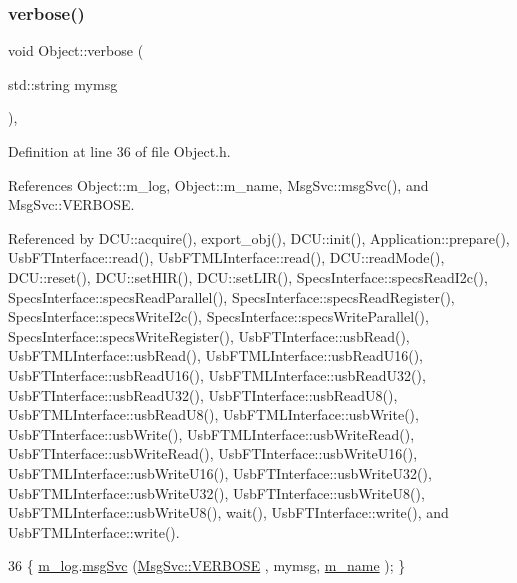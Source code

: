 \subsubsection{\texorpdfstring{verbose()}{verbose()}\hspace{0.1cm}{\footnotesize\ttfamily [1/2]}}
{\footnotesize\ttfamily void Object\+::verbose (\begin{DoxyParamCaption}\item[{std\+::string}]{mymsg }\end{DoxyParamCaption})\hspace{0.3cm}{\ttfamily [inline]}, {\ttfamily [inherited]}}



Definition at line 36 of file Object.\+h.



References Object\+::m\+\_\+log, Object\+::m\+\_\+name, Msg\+Svc\+::msg\+Svc(), and Msg\+Svc\+::\+V\+E\+R\+B\+O\+SE.



Referenced by D\+C\+U\+::acquire(), export\+\_\+obj(), D\+C\+U\+::init(), Application\+::prepare(), Usb\+F\+T\+Interface\+::read(), Usb\+F\+T\+M\+L\+Interface\+::read(), D\+C\+U\+::read\+Mode(), D\+C\+U\+::reset(), D\+C\+U\+::set\+H\+I\+R(), D\+C\+U\+::set\+L\+I\+R(), Specs\+Interface\+::specs\+Read\+I2c(), Specs\+Interface\+::specs\+Read\+Parallel(), Specs\+Interface\+::specs\+Read\+Register(), Specs\+Interface\+::specs\+Write\+I2c(), Specs\+Interface\+::specs\+Write\+Parallel(), Specs\+Interface\+::specs\+Write\+Register(), Usb\+F\+T\+Interface\+::usb\+Read(), Usb\+F\+T\+M\+L\+Interface\+::usb\+Read(), Usb\+F\+T\+M\+L\+Interface\+::usb\+Read\+U16(), Usb\+F\+T\+Interface\+::usb\+Read\+U16(), Usb\+F\+T\+M\+L\+Interface\+::usb\+Read\+U32(), Usb\+F\+T\+Interface\+::usb\+Read\+U32(), Usb\+F\+T\+Interface\+::usb\+Read\+U8(), Usb\+F\+T\+M\+L\+Interface\+::usb\+Read\+U8(), Usb\+F\+T\+M\+L\+Interface\+::usb\+Write(), Usb\+F\+T\+Interface\+::usb\+Write(), Usb\+F\+T\+M\+L\+Interface\+::usb\+Write\+Read(), Usb\+F\+T\+Interface\+::usb\+Write\+Read(), Usb\+F\+T\+Interface\+::usb\+Write\+U16(), Usb\+F\+T\+M\+L\+Interface\+::usb\+Write\+U16(), Usb\+F\+T\+Interface\+::usb\+Write\+U32(), Usb\+F\+T\+M\+L\+Interface\+::usb\+Write\+U32(), Usb\+F\+T\+Interface\+::usb\+Write\+U8(), Usb\+F\+T\+M\+L\+Interface\+::usb\+Write\+U8(), wait(), Usb\+F\+T\+Interface\+::write(), and Usb\+F\+T\+M\+L\+Interface\+::write().


\begin{DoxyCode}
36 \{ \hyperlink{classObject_a0d269813dd7ac1f24bc143031e2963f2}{m\_log}.\hyperlink{classMsgSvc_ad25f18047920cc59a314e5098259711c}{msgSvc} (\hyperlink{classMsgSvc_ae671eb7301996cd049d2da8a65925926af655256b06494ade5ba830abe5401ec9}{MsgSvc::VERBOSE} , mymsg, \hyperlink{classObject_a8b83c95c705d2c3ba0d081fe1710f48d}{m\_name} ); \}
\end{DoxyCode}
\mbox{\label{classObject_a2d4120195317e2a3c6532e8bb9f3da68}} 
